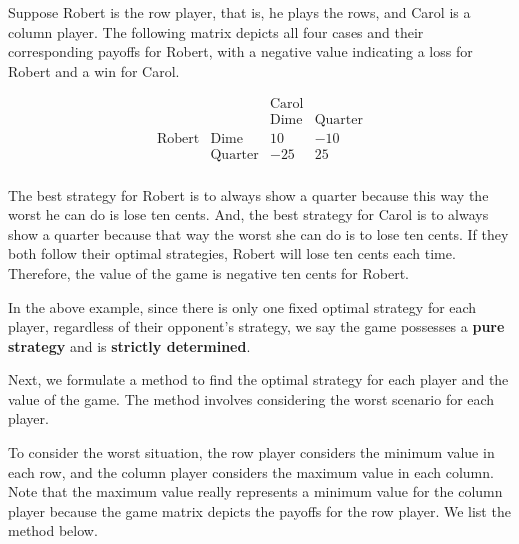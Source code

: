 \begin{solution}
    Suppose Robert is the row player, that is, he plays the rows, and Carol is a column player. The following matrix depicts all four cases and their corresponding payoffs for Robert, with a negative value indicating a loss for Robert and a win for Carol.

    \[
        \begin{array}{cc|cc}
                          &                & \text{Carol} &                \\
                          &                & \text{Dime}  & \text{Quarter} \\
            \hline
            \text{Robert} & \text{Dime}    & 10           & -10            \\
                          & \text{Quarter} & -25          & 25             \\
        \end{array}
    \]

    The best strategy for Robert is to always show a quarter because this way the worst he can do is lose ten cents. And, the best strategy for Carol is to always show a quarter because that way the worst she can do is to lose ten cents. If they both follow their optimal strategies, Robert will lose ten cents each time. Therefore, the value of the game is negative ten cents for Robert.
\end{solution}

In the above example, since there is only one fixed optimal strategy for each player, regardless of their opponent's strategy, we say the game possesses a \textbf{pure strategy} and is \textbf{strictly determined}.

Next, we formulate a method to find the optimal strategy for each player and the value of the game.  The method involves considering the worst scenario for each player.

To consider the worst situation, the row player considers the minimum value in each row, and the column player considers the maximum value in each column.  Note that the maximum value really represents a minimum value for the column player because the game matrix depicts the payoffs for the row player.   We list the method below.

